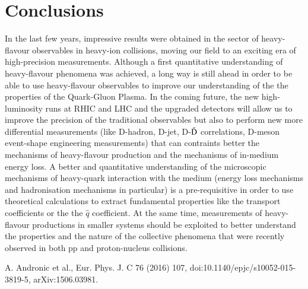 \documentclass{webofc}
\begin{document}
\section{Conclusions}
\label{AAmeasurements}
In the last few years, impressive results were obtained in the sector of heavy-flavour observables in heavy-ion collisions, moving our field to an exciting era of high-precision measurements. 
Although a first quantitative understanding of heavy-flavour phenomena was achieved, a long way is still ahead in order to be able to use heavy-flavour observables to improve our understanding of the 
the properties of the Quark-Gluon Plasma. In the coming future, the new high-luminosity runs at RHIC and LHC and the 
upgraded detectors will allow us to improve the precision of the traditional observables but also to perform new more differential measurements (like D-hadron, D-jet, D-$\rm \bar{D}$ correlations, D-meson event-shape engineering measurements) 
that can contraints better the mechanisms of heavy-flavour production and the mechanisms of in-medium energy loss.  A better and quantitative understanding of the microscopic mechanisms of heavy-quark interaction with the 
medium (energy loss mechanisms and hadronisation mechanisms in particular) is a pre-requisitive in order to use theoretical calculations to extract fundamental properties like the transport coefficients or the the $\hat{q}$ coefficient. 
At the same time, measurements of heavy-flavour productions in smaller systems should be exploited to better understand the properties and the nature of the collective phenomena that 
were recently observed in both pp and proton-nucleus collisions. 

\begin{thebibliography}{}
 A. Andronic et al., Eur. Phys. J. C 76 (2016) 107, doi:10.1140/epjc/s10052-015-3819-5, arXiv:1506.03981. 
\end{thebibliography}
\end{document}
